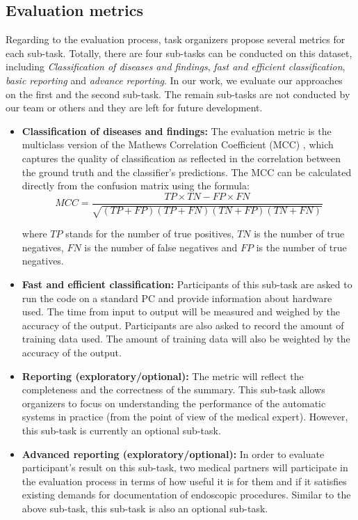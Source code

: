 \subsection{Evaluation metrics}
Regarding to the evaluation process, task organizers propose several metrics for each sub-task. Totally, there are four sub-tasks can be conducted on this dataset, including \textit{Classification of diseases and findings}, \textit{fast and efficient classification}, \textit{basic reporting} and \textit{advance reporting}. In our work, we evaluate our approaches on the first and the second sub-task. The remain sub-tasks are not conducted by our team or others and they are left for future development.
\begin{itemize}
    \item \textbf{Classification of diseases and findings:} The evaluation metric is the multiclass version of the Mathews Correlation Coefficient (MCC) \cite{MATTHEWS1975442}, which captures the quality of classification as reflected in the correlation between the ground truth and the classifier's predictions. The MCC can be calculated directly from the confusion matrix using the formula:
    \begin{equation}
        MCC = \frac{TP \times TN - FP \times FN }{\sqrt{(TP + FP)(TP + FN)(TN + FP)(TN + FN)}}
    \end{equation}
        
    where $TP$ stands for the number of true positives, $TN$ is the number of true negatives, $FN$ is the number of false negatives and $FP$ is the number of true negatives.
    \item \textbf{Fast and efficient classification:} Participants of this sub-task are asked to run the code on a standard PC and provide information about hardware used. The time from input to output will be measured and weighed by the accuracy of the output. Participants are also asked to record the amount of training data used. The amount of training data will also be weighted by the accuracy of the output.
    \item \textbf{Reporting (exploratory/optional):} The metric will reflect the completeness and the correctness of the summary. This sub-task allows organizers to focus on understanding the performance of the automatic systems in practice (from the point of view of the medical expert). However, this sub-task is currently an optional sub-task.

    \item \textbf{Advanced reporting (exploratory/optional):} In order to evaluate participant's result on this sub-task, two medical partners will participate in the evaluation process in terms of how useful it is for them and if it satisfies existing demands for documentation of endoscopic procedures. Similar to  the above sub-task, this sub-task is also an optional sub-task.
\end{itemize}

